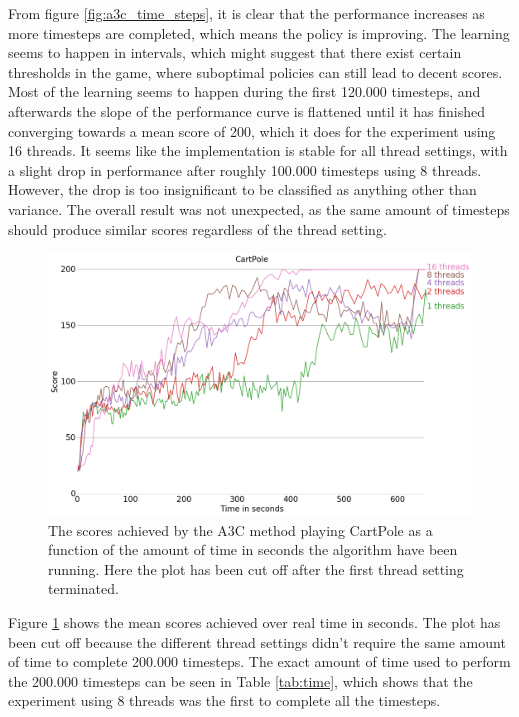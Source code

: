 \documentclass[11pt]{article}
\begin{document}
From figure \ref{fig:a3c_time_steps}, it is clear that the
performance increases as more timesteps are completed, which means
the policy is improving.
The learning seems to happen in intervals, which might suggest
that there exist certain thresholds in the game, where
suboptimal policies can still lead to decent scores.
Most of the learning seems to happen during the first 120.000 timesteps,
and afterwards the slope of the performance curve
is flattened until it has finished converging towards a mean score
of 200, which it does for the experiment using 16 threads.
It seems like the implementation is stable for all thread settings, with a slight
drop in performance after roughly 100.000 timesteps using 8 threads.
However, the drop is too insignificant to be classified as anything other than variance.
The overall result was not unexpected, as the same amount of timesteps should produce similar
scores regardless of the thread setting. 

\begin{figure}[H]
    \centering
    \includegraphics[scale=0.4]{plots/cartpole_compare_time_without_AC.png}
    \caption{The scores achieved by the A3C method playing CartPole as a function
    of the amount of time in seconds the algorithm have been running.
    Here the plot has been cut off after the first thread setting
    terminated.}
    \label{fig:a3c_time}
\end{figure}

Figure \ref{fig:a3c_time} shows the mean scores achieved over real time in seconds.
The plot has been cut off because the different thread settings didn't require the
same amount of time to complete 200.000 timesteps.
The exact amount of time used to perform the 200.000 timesteps can be seen in
Table \ref{tab:time}, which shows that
the experiment using 8 threads was the first to complete all the timesteps.
\end{document}
